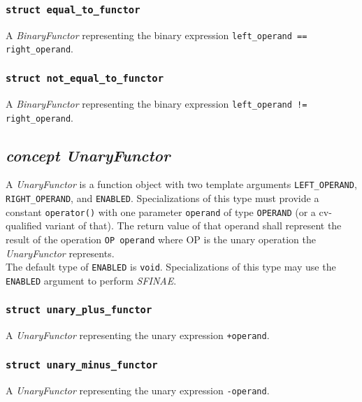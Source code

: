 \documentclass[oneside]{article}
\begin{document}
\subsubsection{\texttt{struct equal\_to\_functor}}
A \textit{BinaryFunctor} representing the binary expression \verb|left_operand == right_operand|.

\subsubsection{\texttt{struct not\_equal\_to\_functor}}
A \textit{BinaryFunctor} representing the binary expression \verb|left_operand != right_operand|.

\subsection{\textit{concept UnaryFunctor}}
A \textit{UnaryFunctor} is a function object with two template arguments \verb+LEFT_OPERAND+,
\verb+RIGHT_OPERAND+, and \verb+ENABLED+. Specializations of this type must provide a
constant \verb+operator()+ with one parameter \verb+operand+ of type \verb+OPERAND+
(or a cv-qualified variant of that). The return value of that operand shall represent the
result of the operation \verb+OP operand+ where OP is the unary operation
the \textit{UnaryFunctor} represents.\\

\noindent{}The default type of \verb+ENABLED+ is \verb+void+. Specializations of this type may use
the \verb+ENABLED+ argument to perform \textit{SFINAE}.

\subsubsection{\texttt{struct unary\_plus\_functor}}
A \textit{UnaryFunctor} representing the unary expression \verb|+operand|.

\subsubsection{\texttt{struct unary\_minus\_functor}}
A \textit{UnaryFunctor} representing the unary expression \verb|-operand|.
\end{document}
